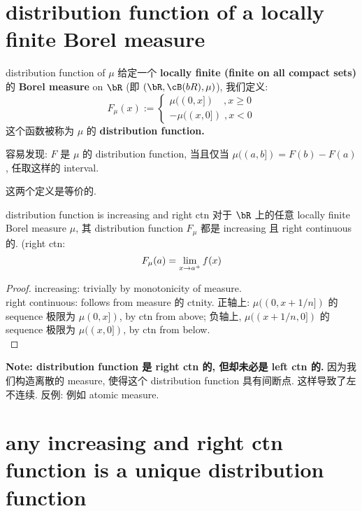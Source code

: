 \documentclass[lang=cn,11pt]{elegantbook}
\begin{document}
\section{distribution function of a locally finite Borel measure}
\begin{definition}{distribution function of $\mu$}
给定一个 \textbf{locally finite (finite on all compact sets)} 的 \textbf{Borel measure} on $\bR$ (即 $(\bR, \cB(bR), \mu)$), 我们定义:
$$
F_\mu(x ) := \begin{cases}
    \mu((0,x]) \quad  , x \geq 0 \\
     -\mu((x,0]) \; , x < 0
\end{cases}
$$
这个函数被称为 $\mu$ 的 \textbf{distribution function.}
\end{definition}

\begin{remark}
\begin{proposition}
        容易发现: $F$ 是 $\mu$ 的 distribution function, 当且仅当 $\mu((a,b]) = F(b) - F(a)$, 任取这样的 interval.
\end{proposition}
这两个定义是等价的. 
\end{remark}

\begin{theorem}{distribution function is increasing and right ctn}
对于 $\bR$ 上的任意 locally finite Borel measure $\mu$, 其 distribution function $F_\mu$ 都是 increasing 且 right continuous 的.
(right ctn:$$F_\mu(a) = \lim_{x\rightarrow a^+} f(x)$$
\end{theorem}
\begin{proof}
    increasing: trivially by monotonicity of measure.\\
    right continuous: follows from measure 的 ctnity. 正轴上: $\mu((0,x+ 1/n])$ 的 sequence 极限为 $\mu(0,x])$, by ctn from above; 负轴上, $\mu((x+ 1/n,0])$ 的 sequence 极限为 $\mu((x,0])$, by ctn from below.\\
\end{proof}
\begin{remark}
   \textbf{ Note: distribution function 是 right ctn 的, 但却未必是 left ctn 的.}
   因为我们构造离散的 measure, 使得这个 distribution function 具有间断点. 这样导致了左不连续.
   反例: 例如 atomic measure. 
\end{remark}





\section{any increasing and right ctn function is a unique distribution function}
\end{document}
